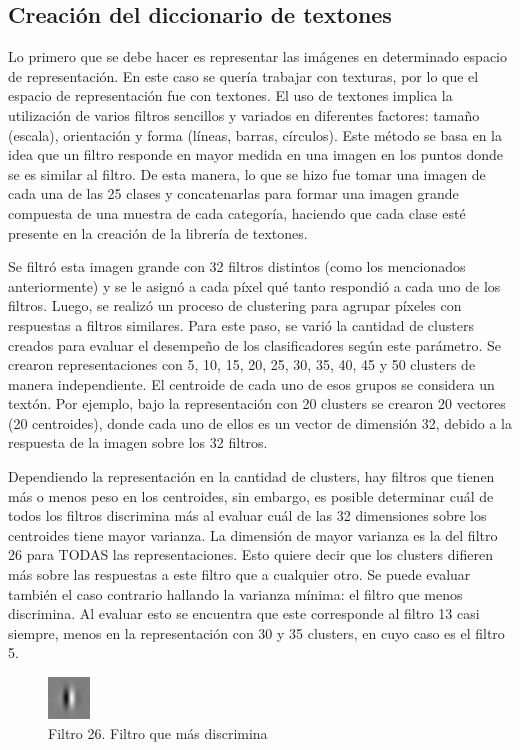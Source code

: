 \documentclass[10pt,twocolumn,letterpaper]{article}
\begin{document}
\subsection{Creación del diccionario de textones}
Lo primero que se debe hacer es representar las imágenes en determinado espacio de representación. En este caso se quería trabajar con texturas, por lo que el espacio de representación fue con textones. El uso de textones implica la utilización de varios filtros sencillos y variados en diferentes factores: tamaño (escala), orientación y forma (líneas, barras, círculos). Este método se basa en la idea que un filtro responde en mayor medida en una imagen en los puntos donde se es similar al filtro. De esta manera, lo que se hizo fue tomar una imagen de cada una de las 25 clases y concatenarlas para formar una imagen grande compuesta de una muestra de cada categoría, haciendo que cada clase esté presente en la creación de la librería de textones.

Se filtró esta imagen grande con 32 filtros distintos (como los mencionados anteriormente) y se le asignó a cada píxel qué tanto respondió a cada uno de los filtros. Luego, se realizó un proceso de clustering para agrupar píxeles con respuestas a filtros similares. Para este paso, se varió la cantidad de clusters creados para evaluar el desempeño de los clasificadores según este parámetro. Se crearon representaciones con 5, 10, 15, 20, 25, 30, 35, 40, 45 y 50 clusters de manera independiente. El centroide de cada uno de esos grupos se considera un textón. Por ejemplo, bajo la representación con 20 clusters se crearon 20 vectores (20 centroides), donde cada uno de ellos es un vector de dimensión 32, debido a la respuesta de la imagen sobre los 32 filtros.

Dependiendo la representación en la cantidad de clusters, hay filtros que tienen más o menos peso en los centroides, sin embargo, es posible determinar cuál de todos los filtros discrimina más al evaluar cuál de las 32 dimensiones sobre los centroides tiene mayor varianza. La dimensión de mayor varianza es la del filtro 26 para TODAS las representaciones. Esto quiere decir que los clusters difieren más sobre las respuestas a este filtro que a cualquier otro. Se puede evaluar también el caso contrario hallando la varianza mínima: el filtro que menos discrimina. Al evaluar esto se encuentra que este corresponde al filtro 13 casi siempre, menos en la representación con 30 y 35 clusters, en cuyo caso es el filtro 5.

\begin{figure}[h]
    \centering
    \includegraphics[width=0.1\textwidth]{Filtro26.jpg}
    \caption{Filtro 26. Filtro que más discrimina}
    \label{fig:filtro 26}
\end{figure}
\end{document}

